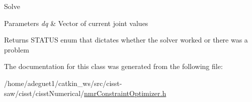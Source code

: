 Solve 
\begin{DoxyParams}{Parameters}
{\em dq} & Vector of current joint values \\
\hline
\end{DoxyParams}
\begin{DoxyReturn}{Returns}
S\-T\-A\-T\-U\-S enum that dictates whether the solver worked or there was a problem 
\end{DoxyReturn}


The documentation for this class was generated from the following file\-:\begin{DoxyCompactItemize}
\item 
/home/adeguet1/catkin\-\_\-ws/src/cisst-\/saw/cisst/cisst\-Numerical/\hyperlink{nmr_constraint_optimizer_8h}{nmr\-Constraint\-Optimizer.\-h}\end{DoxyCompactItemize}
